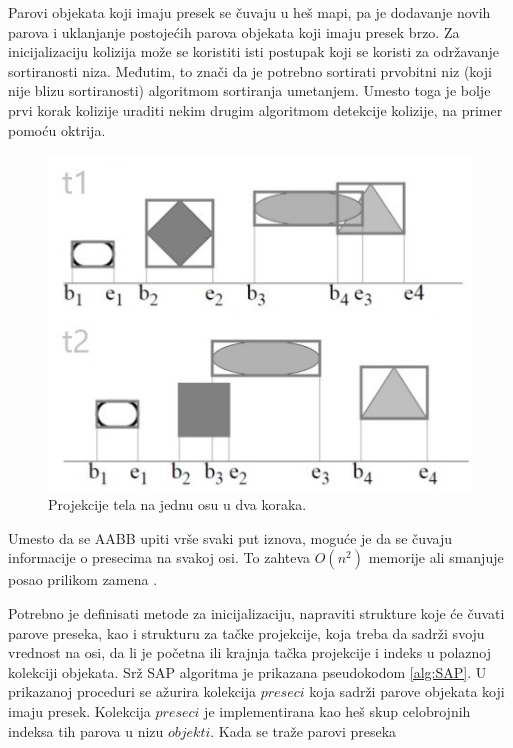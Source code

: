 \documentclass[12pt,oneside]{memoir}
\begin{document}
Parovi objekata koji imaju presek se čuvaju u heš mapi, pa je dodavanje novih parova i uklanjanje postojećih parova objekata koji imaju presek brzo.
Za inicijalizaciju kolizija može se koristiti isti postupak koji se koristi za održavanje sortiranosti niza.
Međutim, to znači da je potrebno sortirati prvobitni niz (koji nije blizu sortiranosti) algoritmom sortiranja umetanjem.
Umesto toga je bolje prvi korak kolizije uraditi nekim drugim algoritmom detekcije kolizije, na primer pomoću oktrija.

\begin{figure}[h!]
	\begin{center}
	\includegraphics[scale=0.8]{sap.jpg}
	\end{center}
	\caption{Projekcije tela na jednu osu u dva koraka.}
	\label{fig:sap}
\end{figure}

Umesto da se AABB upiti vrše svaki put iznova, moguće je da se čuvaju informacije o presecima 
na svakoj osi. To zahteva $O(n^2)$ memorije ali smanjuje posao prilikom zamena \cite{sap}. 

Potrebno je definisati metode za inicijalizaciju, napraviti strukture koje će čuvati parove preseka,
kao i strukturu za tačke projekcije, koja treba da sadrži svoju vrednost na osi, da li je početna ili krajnja tačka projekcije
i indeks u polaznoj kolekciji objekata.
Srž SAP algoritma je prikazana pseudokodom \ref{alg:SAP}. 
U prikazanoj proceduri se ažurira kolekcija $preseci$ koja sadrži parove objekata koji imaju presek. 
Kolekcija $preseci$ je implementirana kao heš skup celobrojnih indeksa tih parova u nizu $objekti$.
Kada se traže parovi preseka 
\end{document}
